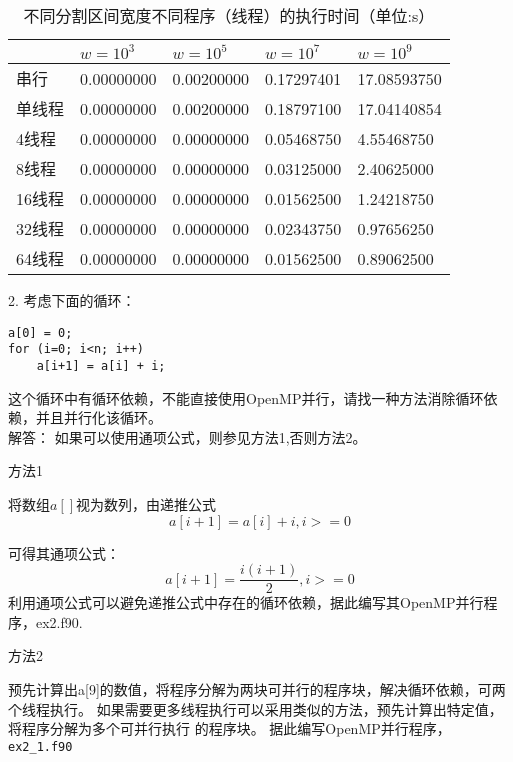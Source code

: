 \documentclass{ctexart}
\begin{document}
\begin{table}[]
    \caption{不同分割区间宽度不同程序（线程）的执行时间（单位:s）}
\label{tab:wvstime}
\centering
\begin{tabular}{@{}lllll@{}}
    \toprule
   & $w=10^3$ & $w=10^5$ & $w=10^7$ & $w=10^9$ \\ \midrule
串行   &0.00000000          &0.00200000          &0.17297401          & 17.08593750          \\
单线程 &0.00000000          &0.00200000          &0.18797100          &17.04140854          \\
4线程  &0.00000000          &0.00000000          & 0.05468750          &4.55468750        \\
8线程  &0.00000000          &0.00000000          &0.03125000          &2.40625000          \\
16线程 &0.00000000          &0.00000000          & 0.01562500          &1.24218750          \\
32线程 &0.00000000          &0.00000000          &0.02343750          &0.97656250 \\
64线程 &0.00000000          &0.00000000          &0.01562500          &0.89062500 \\ \bottomrule
\end{tabular}
\end{table}

2. 考虑下面的循环：

\begin{lstlisting}
a[0] = 0;
for (i=0; i<n; i++)
	a[i+1] = a[i] + i;
\end{lstlisting}

这个循环中有循环依赖，不能直接使用OpenMP并行，请找一种方法消除循环依赖，并且并行化该循环。
\\

{\heiti 解答：}
如果可以使用通项公式，则参见方法1,否则方法2。

{\heiti 方法1}

将数组$a[]$视为数列，由递推公式
$$
a[i+1] = a[i]+i, i>=0
$$

可得其通项公式：
$$
a[i+1] = \frac{i(i+1)}{2}, i>=0
$$
利用通项公式可以避免递推公式中存在的循环依赖，据此编写其OpenMP并行程序，ex2.f90.

{\heiti 方法2}

预先计算出a[9]的数值，将程序分解为两块可并行的程序块，解决循环依赖，可两个线程执行。
如果需要更多线程执行可以采用类似的方法，预先计算出特定值，将程序分解为多个可并行执行
的程序块。
据此编写OpenMP并行程序，\lstinline{ex2_1.f90}
\\
\end{document}
